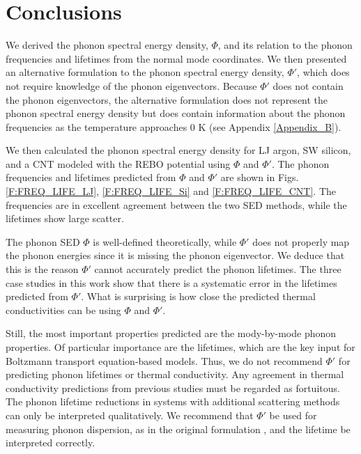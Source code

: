 \documentclass[letterpaper,12pt]{article}
\begin{document}
\section{\label{Section_Conclusions}Conclusions}

We derived the phonon spectral energy density, $\Phi$, and its relation to the phonon frequencies and lifetimes from the normal mode coordinates. We then presented an alternative formulation to the phonon spectral energy density, $\Phi'$, which does not require knowledge of the phonon eigenvectors.  Because $\Phi'$ does not contain the phonon eigenvectors, the alternative formulation does not represent the phonon spectral energy density but does contain information about the phonon frequencies as the temperature approaches $0$ K (see Appendix \ref{Appendix_B}).

We then calculated the phonon spectral energy density for LJ argon, SW silicon, and a CNT modeled with the REBO potential using $\Phi$ and $\Phi'$. The phonon frequencies and
lifetimes predicted from $\Phi$ and $\Phi'$ are shown in Figs$.$ \ref{F:FREQ_LIFE_LJ}, \ref{F:FREQ_LIFE_Si} and \ref{F:FREQ_LIFE_CNT}. The
frequencies are in excellent agreement between the two SED methods, while the lifetimes show large scatter.

The phonon SED $\Phi$ is well-defined theoretically,\cite{dove1993,wallace1972} while $\Phi'$ does not properly map the phonon energies since it is missing the phonon eigenvector. We deduce that this is the reason $\Phi'$ cannot accurately predict the phonon lifetimes. The three case studies in this work show that there is a systematic error in the lifetimes predicted from $\Phi'$. What is surprising is how close the predicted thermal conductivities can be using $\Phi$ and $\Phi'$.

Still, the most important properties predicted are the mody-by-mode phonon properties. Of particular importance are the lifetimes, which are the key input for Boltzmann transport equation-based models.\cite{mcgaughey2011a} Thus, we do not recommend $\Phi'$ for predicting phonon lifetimes or thermal conductivity.  Any agreement in thermal conductivity predictions from previous studies \cite{thomas2010c,dekoker2009,qiu2011} must be regarded as fortuitous. The phonon lifetime reductions in systems with additional scattering methods \cite{thomas2010c,shiomi2011a} can only be interpreted qualitatively. We recommend that $\Phi'$ be used for measuring phonon dispersion, as in the original formulation \cite{maruyama2003}, and the lifetime be interpreted correctly.
\end{document}
